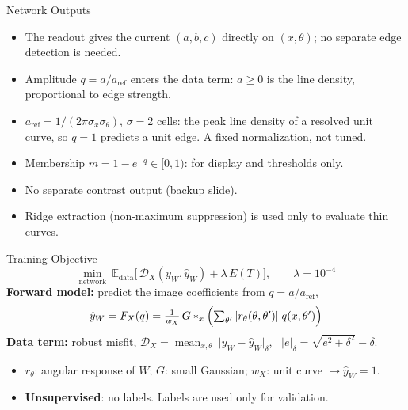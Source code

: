 \documentclass[aspectratio=169]{beamer}
\begin{document}
\begin{frame}{Network Outputs}
  \begin{itemize}
    \item The readout gives the current $(a,b,c)$ directly on $(x,\theta)$; no separate edge detection is needed.
    \item Amplitude $q=a/a_\mathrm{ref}$ enters the data term: $a\ge0$ is the line density, proportional to edge strength.
    \item $a_\mathrm{ref}=1/(2\pi\sigma_x\sigma_\theta)$, $\sigma=2$ cells: the peak line density of a resolved unit curve, so $q=1$ predicts a unit edge. A fixed normalization, not tuned.
    \item Membership $m=1-e^{-q}\in[0,1)$: for display and thresholds only.
    \item No separate contrast output (backup slide).
    \item Ridge extraction (non-maximum suppression) is used only to evaluate thin curves.
  \end{itemize}
\end{frame}

\begin{frame}{Training Objective}
  \[
    \min_{\text{network}}\ \mathbb{E}_{\text{data}}\bigl[\, \mathcal D_X(y_W,\hat y_W) + \lambda\, E(T)\bigr], \qquad \lambda=10^{-4}
  \]
  \textbf{Forward model:} predict the image coefficients from $q=a/a_\mathrm{ref}$,
  \[
    \hat y_W=F_X(q)=\tfrac{1}{w_X}\,G *_x \Bigl(\textstyle\sum_{\theta'} |r_\theta(\theta,\theta')|\;q(x,\theta')\Bigr)
  \]
  \textbf{Data term:} robust misfit, $\mathcal D_X=\operatorname{mean}_{x,\theta}\ \bigl|y_W-\hat y_W\bigr|_\delta$, \ $|e|_\delta=\sqrt{e^2+\delta^2}-\delta$.
  \begin{itemize}
    \item $r_\theta$: angular response of $W$; $G$: small Gaussian; $w_X$: unit curve $\mapsto\hat y_W=1$.
    \item \textbf{Unsupervised}: no labels. Labels are used only for validation.
  \end{itemize}
\end{frame}
\end{document}
